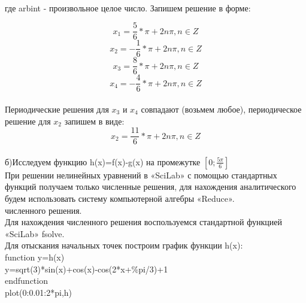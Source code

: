 \documentclass[russian,utf8,nocolumnxxxi,nocolumnxxxii]{eskdtext}
\begin{document}
\begin{figure}[H]
\begin{center}
\begin{minipage}[h]{0.65\linewidth}
  \\
\frametitle{}
\end{minipage}
\end{center}
\end{figure}


где arbint - произвольное целое число. Запишем решение в форме:

$$x_1=\frac{5}{6}*\pi+2n\pi,n\in Z$$
$$x_2=-\frac{1}{6}*\pi+2n\pi,n\in Z$$
$$x_3=\frac{8}{6}*\pi+2n\pi,n\in Z$$
$$x_4=-\frac{4}{6}*\pi+2n\pi,n\in Z$$\\
Периодические решения для $x_3$ и $x_4$ совпадают (возьмем любое), периодическое решение для $x_2$ запишем в виде:
$$x_2=\frac{11}{6}*\pi+2n\pi,n\in Z$$\\


\newpage
б)Исследуем функцию h(x)=f(x)-g(x) на промежутке $[0;\frac{5\pi}{6}]$\\
При решении нелинейных уравнений в «SciLab» с помощью стандартных функций получаем только численные решения, для нахождения аналитического будем использовать систему компьютерной алгебры «Reduce».\\
{ численного решения.}\\
Для нахождения численного решения воспользуемся стандартной функцией «SciLab» fsolve.\\
Для отыскания начальных точек построим график функции h(x):\\
function y=h(x)\\
y=sqrt(3)*sin(x)+cos(x)-cos(2*x+\%pi/3)+1\\
endfunction\\
plot(0:0.01:2*pi,h)\\
\end{document}
